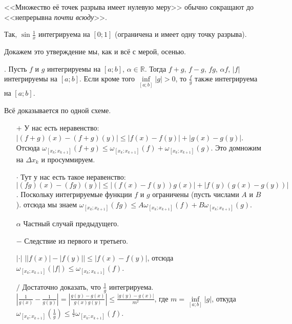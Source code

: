 \documentclass{article}
\begin{document}
\begin{itemize}
        \begin{Comment}
            <<Множество её точек разрыва имеет нулевую меру>> обычно сокращают до <<непрерывна \textit{почти всюду}>>.
        \end{Comment}
        \begin{Example}
            Так, $\sin\frac1x$ интегрируема на $[0;1]$ (ограничена и имеет одну точку разрыва).
        \end{Example}
        \begin{Comment}
            Докажем это утверждение мы, как и всё с мерой, осенью.
        \end{Comment}
        \thm {}. Пусть $f$ и $g$ интегрируемы на $[a;b]$, $\alpha\in\mathbb R$. Тогда $f+g$, $f-g$, $fg$, $\alpha f$, $|f|$ интегрируемы на $[a;b]$. Если кроме того $\inf\limits_{[a;b]}|g|>0$, то $\frac fg$ также интегрируема на $[a;b]$.
        \begin{Proof}
            Всё доказывается по одной схеме.
            \begin{enumerate}
                \item[$+$] У нас есть неравенство: $|(f+g)(x)-(f+g)(y)|\leqslant|f(x)-f(y)|+|g(x)-g(y)|$. Отсюда $\omega_{[x_k;x_{k+1}]}(f+g)\leqslant\omega_{[x_k;x_{k+1}]}(f)+\omega_{[x_k;x_{k+1}]}(g)$. Это домножим на $\Delta x_k$ и просуммируем.
                \item[$\cdot$] Тут у нас есть такое неравенство: $|(fg)(x)-(fg)(y)|\leqslant|(f(x)-f(y))g(x)|+|f(y)(g(x)-g(y))|$. Поскольку интегрируемые функции $f$ и $g$ ограничены (пусть числами $A$ и $B$). отсюда мы знаем $\omega_{[x_k;x_{k+1}]}(fg)\leqslant A\omega_{[x_k;x_{k+1}]}(f)+B\omega_{[x_k;x_{k+1}]}(g)$.
                \item[$\alpha$] Частный случай предыдущего.
                \item[$-$] Следствие из первого и третьего.
                \item[$|\cdot|$] $\big||f(x)|-|f(y)|\big|\leqslant|f(x)-f(y)|$, отсюда $\omega_{[x_k;x_{k+1}]}(|f|)\leqslant\omega_{[x_k;x_{k+1}]}(f)$.
                \item[$/$] Достаточно доказать, что $\frac1g$ интегрируема. $\left|\frac1{g(x)}-\frac1{g(y)}\right|=\left|\frac{g(y)-g(x)}{g(x)g(y)}\right|\leqslant\frac{|g(y)-g(x)|}{m^2}$, где $m=\inf\limits_{[a;b]}|g|$, откуда $\omega_{[x_k;x_{k+1}]}\left(\frac1g\right)\leqslant\frac1{^2}\omega_{[x_k;x_{k+1}]}(f)$.
            \end{enumerate}

\end{Proof}
\end{itemize}
\end{document}
